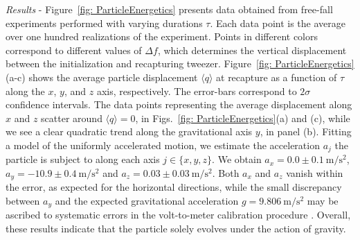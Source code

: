 \documentclass[twocolumn,preprintnumbers,superscriptaddress,amsmath,amssymb,aps,pra,10pt]{revtex4-1}
\newcommand{\<}{\langle}
\renewcommand{\>}{\rangle}
\renewcommand{\>}{\rangle}
\begin{document}
\textit{Results} - Figure~\ref{fig: ParticleEnergetics} presents data obtained from free-fall experiments performed with varying durations $\tau$. 
%
Each data point is the average over one hundred realizations of the experiment.
%
Points in different colors correspond to different values of $\Delta f$, which determines the vertical displacement between the initialization and recapturing tweezer.
%
Figure~\ref{fig: ParticleEnergetics}(a-c) shows the average particle displacement $\langle q \rangle$ at recapture as a function of $\tau$ along the $x$, $y$, and $z$ axis, respectively.
%
The error-bars correspond to $2\sigma$ confidence intervals.
%
The data points representing the average displacement along $x$ and $z$ scatter around $\langle q \rangle=0$, in Figs.~\ref{fig: ParticleEnergetics}(a) and (c), while we see a clear quadratic trend along the gravitational axis $y$, in panel (b). 
%
Fitting a model of the uniformly accelerated motion, we estimate the acceleration $a_j$ the particle is subject to along each axis $j\in\lbrace x,y,z \rbrace$.
%
We obtain $a_{x}=0.0\pm 0.1~\mathrm{m/s^2}$, $a_{y}=-10.9 \pm 0.4~\mathrm{m/s^2}$ and $a_{z}=0.03\pm 0.03~\mathrm{m/s^2}$. 
%
Both $a_x$ and $a_z$ vanish within the error, as expected for the horizontal directions, while the small discrepancy between $a_y$ and the expected gravitational acceleration $g=9.806~\mathrm{m/s^2}$ may be ascribed to systematic errors in the volt-to-meter calibration procedure \cite{supplemental}. 
%
Overall, these results indicate that the particle solely evolves under the action of gravity.
\end{document}
